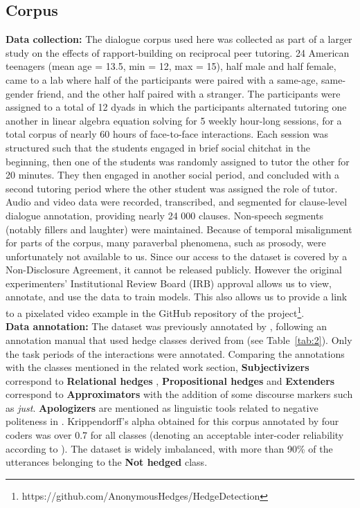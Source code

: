 \documentclass[11pt]{article}
\begin{document}
\subsection{Corpus}
\noindent\textbf{Data collection:}
The dialogue corpus used here was collected as part of a larger study on the effects of rapport-building on reciprocal peer tutoring. 24 American teenagers (mean age = 13.5, min = 12, max = 15), half male and half female, came to a lab where half of the participants were paired with a same-age, same-gender friend, and the other half paired with a stranger. The participants were assigned to a total of 12 dyads in which the participants alternated tutoring one another in linear algebra equation solving for 5 weekly hour-long sessions, for a total corpus of nearly 60 hours of face-to-face interactions. Each session was structured such that the students engaged in brief social chitchat in the beginning, then one of the students was randomly assigned to tutor the other for 20 minutes. They then engaged in another social period, and concluded with a second tutoring period where the other student was assigned the role of tutor. Audio and video data were recorded, transcribed, and segmented for clause-level dialogue annotation, providing nearly 24 000 clauses. Non-speech segments (notably fillers and laughter) were maintained. Because of temporal misalignment for parts of the corpus, many paraverbal phenomena, such as prosody, were unfortunately not available to us.
\noindent Since our access to the dataset is covered by a Non-Disclosure Agreement, it cannot be released publicly. However the original experimenters' Institutional Review Board (IRB) approval allows us to view, annotate, and use the data to train models. This also allows us to provide a link to a pixelated video example in the GitHub repository of the project\footnote{https://github.com/AnonymousHedges/HedgeDetection}. \\
\noindent\textbf{Data annotation:}
The dataset was previously annotated by \citet{Madaio2017}, following an annotation manual that used hedge classes derived from \citet{Rowland2007} (see Table~\ref{tab:2}). Only the task periods of the interactions were annotated.  Comparing the annotations with the classes mentioned in the related work section, \textbf{Subjectivizers} correspond to \textbf{Relational hedges} \cite{Fraser2010}, \textbf{Propositional hedges} and \textbf{Extenders} correspond to \textbf{Approximators} \cite{Prince1982} with the addition of some discourse markers such as \textit{just}. \textbf{Apologizers} are mentioned as linguistic tools related to negative politeness in \citet{Brown1987}. 
\noindent Krippendorff’s alpha obtained for this corpus annotated by four coders was over 0.7 for all classes (denoting an acceptable inter-coder reliability according to \citet{Krippendorff2004}). 
The dataset is widely imbalanced, with more than 90\% of the utterances belonging to the \textbf{Not hedged} class. 
\end{document}
